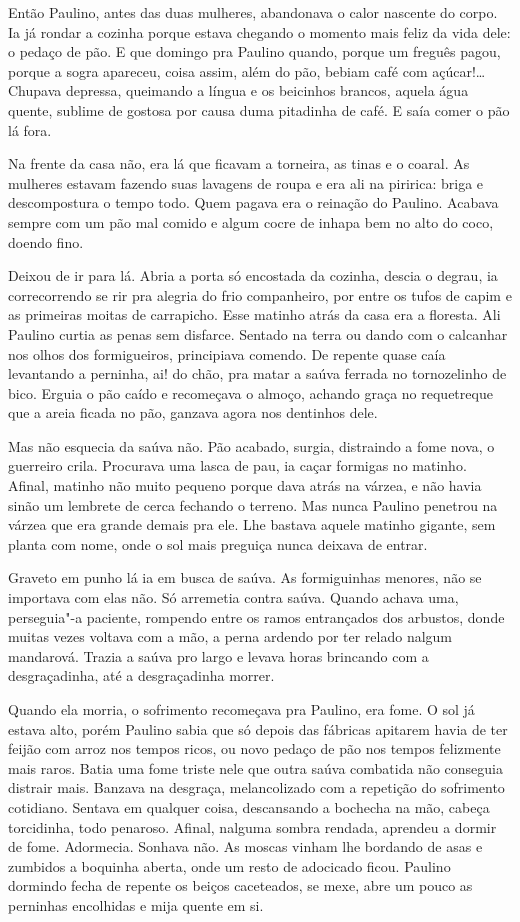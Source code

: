 \begin{linenumbers}
Então Paulino, antes das duas mulheres, abandonava o calor nascente do
corpo. Ia já rondar a cozinha porque estava chegando o momento mais
feliz da vida dele: o pedaço de pão. E que domingo pra Paulino quando,
porque um freguês pagou, porque a sogra apareceu, coisa assim, além do
pão, bebiam café com açúcar!\ldots{} Chupava depressa, queimando a língua e
os beicinhos brancos, aquela água quente, sublime de gostosa por causa
duma pitadinha de café. E saía comer o pão lá fora.

Na frente da casa não, era lá que ficavam a torneira, as tinas e o
coaral. As mulheres estavam fazendo suas lavagens de roupa e era ali na
piririca: briga e descompostura o tempo todo. Quem pagava era o reinação
do Paulino. Acabava sempre com um pão mal comido e algum cocre de inhapa
bem no alto do coco, doendo fino.

Deixou de ir para lá. Abria a porta só encostada da cozinha, descia o
degrau, ia correcorrendo se rir pra alegria do frio companheiro, por
entre os tufos de capim e as primeiras moitas de carrapicho. Esse
matinho atrás da casa era a floresta. Ali Paulino curtia as penas sem
disfarce. Sentado na terra ou dando com o calcanhar nos olhos dos
formigueiros, principiava comendo. De repente quase caía levantando a
perninha, ai! do chão, pra matar a saúva ferrada no tornozelinho de
bico. Erguia o pão caído e recomeçava o almoço, achando graça no
requetreque que a areia ficada no pão, ganzava agora nos dentinhos dele.

Mas não esquecia da saúva não. Pão acabado, surgia, distraindo a fome
nova, o guerreiro crila. Procurava uma lasca de pau, ia caçar formigas
no matinho. Afinal, matinho não muito pequeno porque dava atrás na
várzea, e não havia sinão um lembrete de cerca fechando o terreno. Mas
nunca Paulino penetrou na várzea que era grande demais pra ele. Lhe
bastava aquele matinho gigante, sem planta com nome, onde o sol mais
preguiça nunca deixava de entrar.

Graveto em punho lá ia em busca de saúva. As formiguinhas menores, não
se importava com elas não. Só arremetia contra saúva. Quando achava uma,
perseguia"-a paciente, rompendo entre os ramos entrançados dos arbustos,
donde muitas vezes voltava com a mão, a perna ardendo por ter relado
nalgum mandarová. Trazia a saúva pro largo e levava horas brincando com
a desgraçadinha, até a desgraçadinha morrer.

Quando ela morria, o sofrimento recomeçava pra Paulino, era fome. O sol
já estava alto, porém Paulino sabia que só depois das fábricas apitarem
havia de ter feijão com arroz nos tempos ricos, ou novo pedaço de pão
nos tempos felizmente mais raros. Batia uma fome triste nele que outra
saúva combatida não conseguia distrair mais. Banzava na desgraça,
melancolizado com a repetição do sofrimento cotidiano. Sentava em
qualquer coisa, descansando a bochecha na mão, cabeça torcidinha, todo
penaroso. Afinal, nalguma sombra rendada, aprendeu a dormir de fome.
Adormecia. Sonhava não. As moscas vinham lhe bordando de asas e zumbidos
a boquinha aberta, onde um resto de adocicado ficou. Paulino dormindo
fecha de repente os beiços caceteados, se mexe, abre um pouco as
perninhas encolhidas e mija quente em si.


\end{linenumbers}
